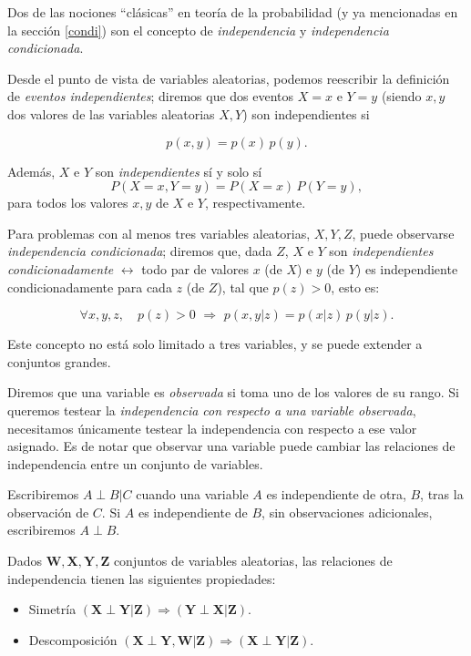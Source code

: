 Dos de las nociones ``clásicas'' en teoría de la probabilidad (y ya mencionadas en la sección \ref{condi}) son 
el concepto de {\em independencia} y {\em independencia condicionada}. 

Desde el punto de vista de variables aleatorias, podemos reescribir la definición de {\em eventos independientes}; 
diremos que dos eventos $X=x$ e $Y=y$ (siendo $x,y$ dos valores de las variables aleatorias $X,Y$) son 
independientes si 

$$p(x,y) = p(x) \, p(y).$$

Además, $X$ e $Y$ son {\em independientes} sí y solo sí $$P(X=x, Y=y) = P(X=x) \, P(Y=y),$$ 
para todos los valores $x,y$ de $X$ e $Y$, respectivamente.

Para problemas con al menos tres variables aleatorias, $X,Y,Z$, puede observarse {\em independencia 
condicionada}; diremos que, dada $Z$, $X$ e $Y$ son {\em independientes condicionadamente } $\leftrightarrow$ todo par 
de valores $x$ (de $X$) e $y$ (de $Y$) es independiente condicionadamente para cada $z$ (de $Z$), tal que 
$p(z) > 0$, esto es:

$$\forall x, y, z, \quad p(z) > 0 \,\, \Rightarrow \,\, p(x,y|z) = p(x|z)\, p(y|z).$$

Este concepto no está solo limitado a tres variables, y se puede extender a conjuntos grandes.

Diremos que una variable es {\em observada} si toma uno de los valores de su rango. Si queremos testear la {\em 
independencia con respecto a una variable observada}, necesitamos únicamente testear la independencia con respecto 
a ese valor asignado. Es de notar que observar una variable puede cambiar las relaciones de independencia entre
un conjunto de variables.

Escribiremos $A\perp B | C$ cuando una variable $A$ es independiente de otra, $B$, tras la observación de $C$. Si 
$A$ es independiente de $B$, sin observaciones adicionales, escribiremos $A \perp B$.

Dados $\mathbf{W, X, Y, Z}$ conjuntos de variables aleatorias, las relaciones de independencia tienen 
las siguientes propiedades:

\begin{itemize}
 \item Simetría $(\mathbf{X} \perp \mathbf{Y} | \mathbf{Z}) \Rightarrow (\mathbf{Y} \perp \mathbf{X} | \mathbf{Z})$.
 \item Descomposición $(\mathbf{X} \perp \mathbf{Y, W} | \mathbf{Z}) \Rightarrow (\mathbf{X} \perp \mathbf{Y} | \mathbf{Z})$.
\end{itemize}

